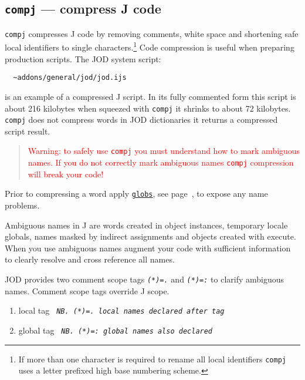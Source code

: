 \subsection{\texttt{compj} --- compress J code}

  \texttt{compj} compresses J code by
  removing comments, white space and shortening safe local identifiers to single
  characters.\footnote{If more than one character is required to rename all
  local identifiers \texttt{compj} uses a letter prefixed high base numbering scheme. }
  Code compression is useful when preparing production scripts. The
  JOD system script:
  
\begin{verbatim}
  ~addons/general/jod/jod.ijs
\end{verbatim}

  is an example of a compressed J script. In its fully commented
  form this script is about 216 kilobytes when squeezed with
  \texttt{compj} it shrinks to about 72 kilobytes.
  \texttt{compj} does not compress words in JOD
  dictionaries it returns a compressed script result.
  
\begin{quotation}
 \noindent\textcolor{red}{Warning: to safely use
	  \texttt{compj} you must understand how to mark
	  ambiguous names. If you do not correctly mark ambiguous names
	  \texttt{compj} compression will break your
	  code!}
\end{quotation}
  
  Prior to compressing a word apply \hyperlink{il:globs}{\texttt{globs}}, 
  see page~\pageref{ss:globs}, to expose any name problems.

  Ambiguous names in J are words created in object instances,
  temporary locale globals, names masked by indirect assignments and objects
  created with execute. When you use ambiguous names augment your code with
  sufficient information to clearly resolve and cross reference
   all names. 
  
  JOD provides two comment scope tags
   \textcolor{CodeComment}{\texttt{\textsl{(*)=.}}} and
  \textcolor{CodeComment}{\texttt{\textsl{(*)=:}}} to clarify ambiguous names.  Comment
  scope tags override J scope.  

\begin{enumerate}
	\item local tag \textcolor{CodeComment}{\texttt{\textsl{ NB. (*)=. local names declared after tag}}}
	\item global tag \textcolor{CodeComment}{\texttt{\textsl{ NB. (*)=: global names also declared}}}
\end{enumerate}
  
